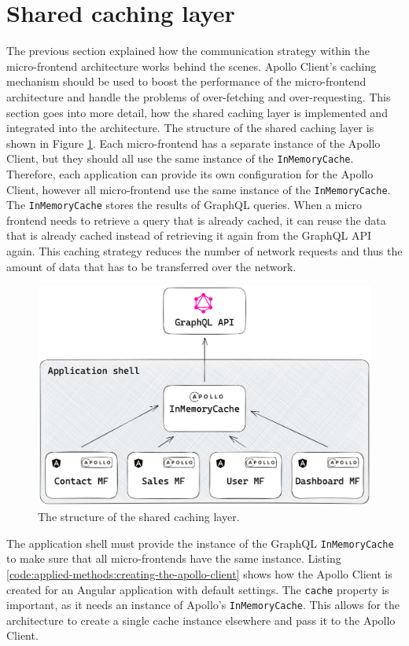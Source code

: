\section{Shared caching layer}\label{section:applied-methods:shared-caching-layer}

The previous section explained how the communication strategy within the micro-frontend architecture works behind the scenes. Apollo Client's caching mechanism should be used to boost the performance of the micro-frontend architecture and handle the problems of over-fetching and over-requesting. This section goes into more detail, how the shared caching layer is implemented and integrated into the architecture. The structure of the shared caching layer is shown in Figure \ref{fig:applied-methods:structure-shared-caching-layer}. Each micro-frontend has a separate instance of the Apollo Client, but they should all use the same instance of the \texttt{InMemoryCache}. Therefore, each application can provide its own configuration for the Apollo Client, however all micro-frontend use the same instance of the \texttt{InMemoryCache}. The \texttt{InMemoryCache} stores the results of GraphQL queries. When a micro frontend needs to retrieve a query that is already cached, it can reuse the data that is already cached instead of retrieving it again from the GraphQL \ac{API} again. This caching strategy reduces the number of network requests and thus the amount of data that has to be transferred over the network.

\ifshowImages
  \begin{figure}[H]
  \centering
  \includegraphics[width=0.7\linewidth]{images/applied-methods/shared-caching-layer/shared-caching-layer.png}
  \caption{The structure of the shared caching layer.}\label{fig:applied-methods:structure-shared-caching-layer}
  \end{figure}
\fi

\noindent The application shell must provide the instance of the GraphQL \texttt{InMemoryCache} to make sure that all micro-frontends have the same instance. Listing \ref{code:applied-methods:creating-the-apollo-client} shows how the Apollo Client is created for an Angular application with default settings. The \texttt{cache} property is important, as it needs an instance of Apollo's \texttt{InMemoryCache}. This allows for the architecture to create a single cache instance elsewhere and pass it to the Apollo Client. 

